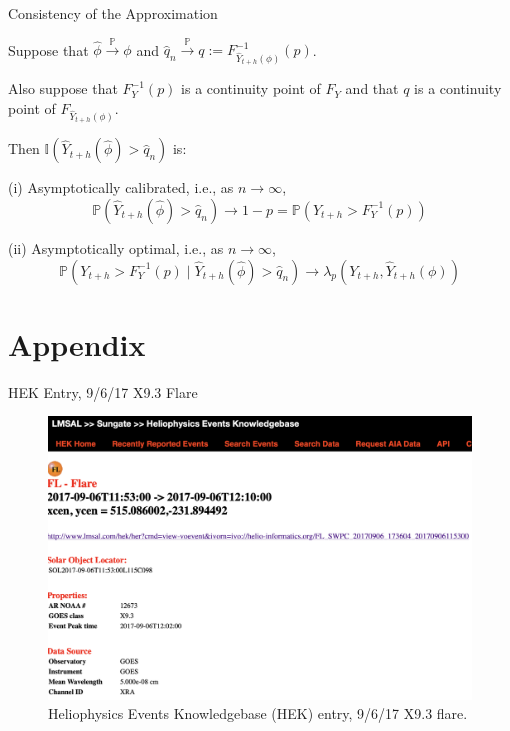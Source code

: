 \documentclass{beamer}
\def\I{\mathbb I}
\def\P{\mathbb P}
\newcommand{\AROptPred}[3]{\hat{Y}_{#1 + #2}(#3)}
\newcommand{\approxAROptPred}[3]{\hat{Y}_{#1 + #2}(\hat{#3})}
\begin{document}
\begin{frame}{Consistency of the Approximation}
    \begin{theorem}
        Suppose that $\hat{\phi} \xrightarrow{\P} \phi$ and $\hat{q}_n \xrightarrow{\P} q := F_{\AROptPred{t}{h}{\phi}}^{-1}(p)$.
        
        Also suppose that $F_Y^{-1}(p)$ is a continuity point of $F_Y$ and that $q$ is a continuity point of $F_{\AROptPred{t}{h}{\phi}}$.
        
        Then $\I(\approxAROptPred{t}{h}{\phi} > \hat{q}_n)$ is:
        
        (i) Asymptotically calibrated, i.e., as $n \to \infty$,
        \[
        \P(\approxAROptPred{t}{h}{\phi} > \hat{q}_n) \to 1 - p = \P(Y_{t + h} > F_Y^{-1}(p))
        \]
        
        (ii) Asymptotically optimal, i.e., as $n \to \infty$,
        \[
        \P(Y_{t+h} > F_Y^{-1}(p) \mid \approxAROptPred{t}{h}{\phi} > \hat{q}_n) \to \lambda_p(Y_{t + h}, \AROptPred{t}{h}{\phi})
        \]
    \end{theorem}
\end{frame}

\section{Appendix}

\begin{frame}{HEK Entry, 9/6/17 X9.3 Flare}
    \begin{figure}
        \centering
        \includegraphics[scale=0.3]{hek_entry_20170906.png}
        \caption{Heliophysics Events Knowledgebase (HEK) entry, 9/6/17 X9.3 flare.}
        \label{fig:hek_entry}
    \end{figure}
\end{frame}
\end{document}
